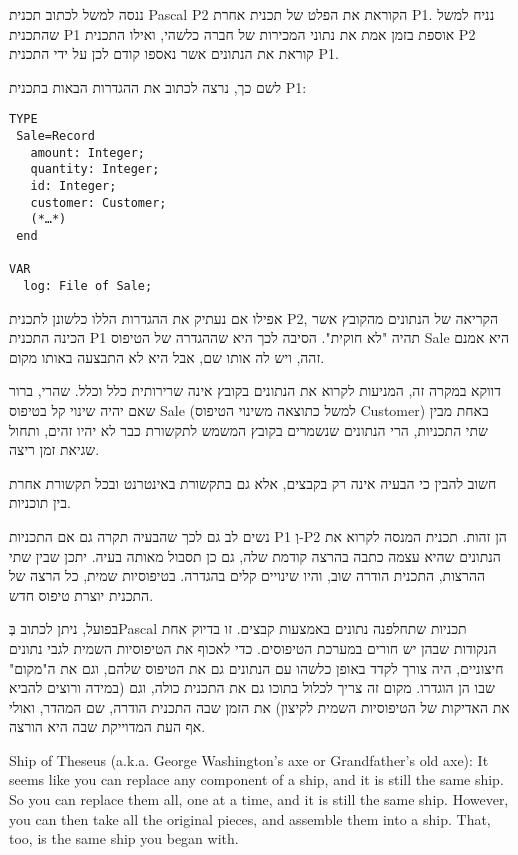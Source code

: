      ננסה למשל לכתוב תכנית Pascal P2 הקוראת את הפלט של תכנית אחרת P1. נניח למשל שהתכנית P1 אוספת בזמן אמת את נתוני המכירות של חברה כלשהי, ואילו התכנית P2 קוראת את הנתונים אשר נאספו קודם לכן על ידי התכנית P1.

      לשם כך, נרצה לכתוב את ההגדרות הבאות בתכנית P1:

\begin{verbatim}
TYPE
 Sale=Record
   amount: Integer;
   quantity: Integer;
   id: Integer;
   customer: Customer;
   (*…*)
 end

VAR
  log: File of Sale;
\end{verbatim}

      אפילו אם נעתיק את ההגדרות הללו כלשונן לתכנית P2, הקריאה של הנתונים מהקובץ אשר
      הכינה התכנית P1 תהיה "לא חוקית". הסיבה לכך היא שההגדרה של הטיפוס Sale היא אמנם
      זהה, ויש לה אותו שם, אבל היא לא התבצעה באותו מקום.

      דווקא במקרה זה, המניעות לקרוא את הנתונים בקובץ אינה שרירותית כלל וכלל. שהרי,
      ברור שאם יהיה שינוי קל בטיפוס Sale (למשל כתוצאה משינוי הטיפוס Customer) באחת
      מבין שתי התכניות, הרי הנתונים שנשמרים בקובץ המשמש לתקשורת כבר לא יהיו זהים,
      ותחול שגיאת זמן ריצה.

      חשוב להבין כי הבעיה אינה רק בקבצים, אלא גם בתקשורת באינטרנט ובכל תקשורת אחרת
      בין תוכניות.

      נשים לב גם לכך שהבעיה תקרה גם אם התכניות P1 וְ-P2 הן זהות. תכנית המנסה לקרוא את הנתונים שהיא עצמה כתבה בהרצה קודמת שלה, גם כן תסבול מאותה בעיה. יתכן שבין שתי ההרצות, התכנית הודרה שוב, והיו שינויים קלים בהגדרה. בטיפוסיות שמית, כל הרצה של התכנית יוצרת טיפוס חדש.

      בפועל, ניתן לכתוב בְּPascal תכניות שתחלפנה נתונים באמצעות קבצים. זו בדיוק אחת
      הנקודות שבהן יש חורים במערכת הטיפוסים. כדי לאכוף את הטיפוסיות השמית לגבי נתונים
      חיצוניים, היה צורך לקדד באופן כלשהו עם הנתונים גם את הטיפוס שלהם, וגם את
      ה"מקום" שבו הן הוגדרו. מקום זה צריך לכלול בתוכו גם את התכנית כולה, וגם (במידה
      ורוצים להביא את האדיקות של הטיפוסיות השמית לקיצון) את הזמן שבה התכנית הודרה, שם
      המהדר, ואולי אף העת המדוייקת שבה היא הורצה.

      Ship of Theseus (a.k.a. George Washington's axe or Grandfather's old axe): It
      seems like you can replace any component of a ship, and it is still the same
      ship. So you can replace them all, one at a time, and it is still the same
      ship. However, you can then take all the original pieces, and assemble them
      into a ship. That, too, is the same ship you began with.

